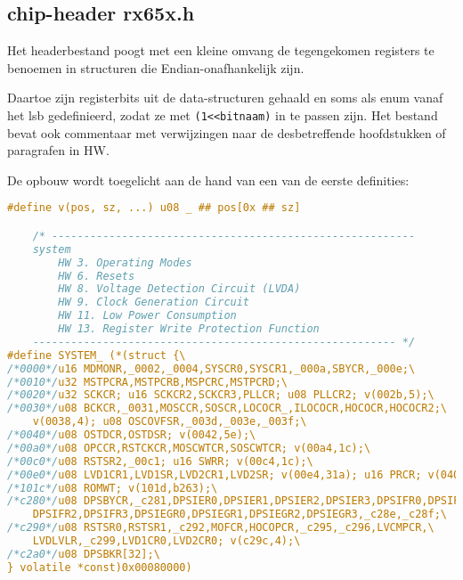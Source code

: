 \documentclass[a4paper, 11pt, fleqn, twoside]{scrartcl}%
\begin{document}
\subsection{chip-header rx65x.h}
Het headerbestand poogt met een kleine omvang de tegengekomen registers te
benoemen in structuren die Endian-onafhankelijk zijn.

Daartoe zijn registerbits uit de data-structuren gehaald en soms als enum
 vanaf het lsb gedefinieerd, zodat ze met \verb|(1<<bitnaam)| in te passen zijn.
 Het bestand bevat ook commentaar met verwijzingen naar de desbetreffende 
hoofdstukken of paragrafen in HW.

De opbouw wordt toegelicht aan de hand van een van de eerste definities:

\begin{lstlisting}[language=C,backgroundcolor=\color{orange!10},framerule=0pt,columns=fixed]
#define v(pos, sz, ...) u08 _ ## pos[0x ## sz]

	/* ---------------------------------------------------------
	system
		HW 3. Operating Modes
		HW 6. Resets
		HW 8. Voltage Detection Circuit (LVDA)
		HW 9. Clock Generation Circuit
		HW 11. Low Power Consumption
		HW 13. Register Write Protection Function
	--------------------------------------------------------- */
#define SYSTEM_ (*(struct {\
/*0000*/u16 MDMONR,_0002,_0004,SYSCR0,SYSCR1,_000a,SBYCR,_000e;\
/*0010*/u32 MSTPCRA,MSTPCRB,MSPCRC,MSTPCRD;\
/*0020*/u32 SCKCR; u16 SCKCR2,SCKCR3,PLLCR; u08 PLLCR2; v(002b,5);\
/*0030*/u08 BCKCR,_0031,MOSCCR,SOSCR,LOCOCR_,ILOCOCR,HOCOCR,HOCOCR2;\
    v(0038,4); u08 OSCOVFSR,_003d,_003e,_003f;\
/*0040*/u08 OSTDCR,OSTDSR; v(0042,5e);\
/*00a0*/u08 OPCCR,RSTCKCR,MOSCWTCR,SOSCWTCR; v(00a4,1c);\
/*00c0*/u08 RSTSR2,_00c1; u16 SWRR; v(00c4,1c);\
/*00e0*/u08 LVD1CR1,LVD1SR,LVD2CR1,LVD2SR; v(00e4,31a); u16 PRCR; v(0400,c1c);\
/*101c*/u08 ROMWT; v(101d,b263);\
/*c280*/u08 DPSBYCR,_c281,DPSIER0,DPSIER1,DPSIER2,DPSIER3,DPSIFR0,DPSIFR1,\
    DPSIFR2,DPSIFR3,DPSIEGR0,DPSIEGR1,DPSIEGR2,DPSIEGR3,_c28e,_c28f;\
/*c290*/u08 RSTSR0,RSTSR1,_c292,MOFCR,HOCOPCR,_c295,_c296,LVCMPCR,\
    LVDLVLR,_c299,LVD1CR0,LVD2CR0; v(c29c,4);\
/*c2a0*/u08 DPSBKR[32];\
} volatile *const)0x00080000)
\end{lstlisting}
\end{document}
